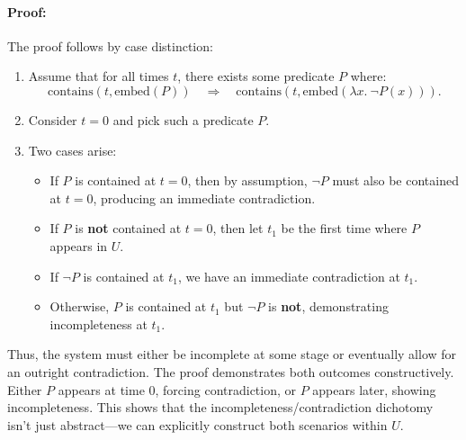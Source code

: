 \documentclass[12pt]{article}
\begin{document}
\paragraph{Proof:}
The proof follows by case distinction:

\begin{enumerate}
    \item Assume that for all times \( t \), there exists some predicate \( P \) where:
    \[
    \text{contains}(t, \text{embed}(P)) \quad \Rightarrow \quad \text{contains}(t, \text{embed}(\lambda x.\ \neg P(x))).
    \]
    \item Consider \( t = 0 \) and pick such a predicate \( P \).
    \item Two cases arise:
    
    \begin{itemize}
        \item If \( P \) is contained at \( t = 0 \), then by assumption, \( \neg P \) must also be contained at \( t = 0 \), producing an immediate contradiction.
        \item If \( P \) is \textbf{not} contained at \( t = 0 \), then let \( t_1 \) be the first time where \( P \) appears in \( U \).
        \item If \( \neg P \) is contained at \( t_1 \), we have an immediate contradiction at \( t_1 \).
        \item Otherwise, \( P \) is contained at \( t_1 \) but \( \neg P \) is \textbf{not}, demonstrating incompleteness at \( t_1 \).
    \end{itemize}
\end{enumerate}

Thus, the system must either be incomplete at some stage or eventually allow for an outright contradiction. The proof demonstrates both outcomes constructively. Either \( P \) appears at time \( 0 \), forcing contradiction, or \( P \) appears later, showing incompleteness. This shows that the incompleteness/contradiction dichotomy isn’t just abstract—we can explicitly construct both scenarios within \( U \).
\end{document}
